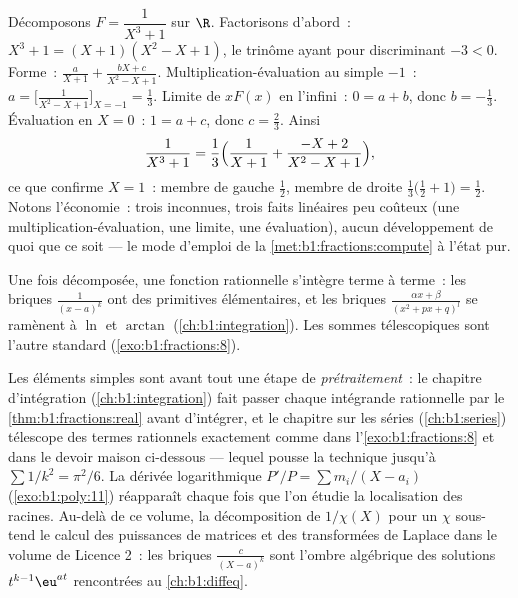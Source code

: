 \begin{example}\label{ex:b1:fractions:cubic}
Décomposons $F = \dfrac{1}{X^3 + 1}$ sur $\R$. Factorisons d'abord~:
$X^3 + 1 = (X + 1)(X^2 - X + 1)$, le trinôme ayant pour discriminant $-3
< 0$. Forme~: $\frac{a}{X+1} + \frac{bX + c}{X^2 - X + 1}$.
Multiplication-évaluation au  simple $-1$~: $a = \bigl[\frac1{X^2 -
X + 1}\bigr]_{X=-1} = \frac13$. Limite de $xF(x)$ en l'infini~: $0 = a +
b$, donc $b = -\frac13$. Évaluation en $X = 0$~: $1 = a + c$, donc $c =
\frac23$. Ainsi
\[
\frac{1}{X^3+1} = \frac13\Bigl(\frac{1}{X+1}
+ \frac{-X + 2}{X^2 - X + 1}\Bigr) ,
\]
ce que confirme $X = 1$~: membre de gauche $\frac12$, membre de droite
$\frac13\bigl(\frac12 + 1\bigr) = \frac12$. Notons l'économie~: trois
inconnues, trois faits linéaires peu coûteux (une
multiplication-évaluation, une limite, une évaluation), aucun
développement de quoi que ce soit --- le mode d'emploi de la
\cref{met:b1:fractions:compute} à l'état pur.
\end{example}

\begin{remark}
Une fois décomposée, une fonction rationnelle s'intègre terme à terme~:
les briques $\frac{1}{(x-a)^k}$ ont des primitives élémentaires, et les
briques $\frac{\alpha x + \beta}{(x^2 + px + q)^l}$ se ramènent à $\ln$
et $\arctan$ (\cref{ch:b1:integration}). Les sommes télescopiques sont
l'autre  standard (\cref{exo:b1:fractions:8}).
\end{remark}

\begin{remark}\label{rem:b1:fractions:whereused}
Les éléments simples sont avant tout une étape de
\emph{prétraitement}~: le chapitre d'intégration
(\cref{ch:b1:integration}) fait passer chaque intégrande rationnelle par
le \cref{thm:b1:fractions:real} avant d'intégrer, et le chapitre sur les
séries (\cref{ch:b1:series}) télescope des termes rationnels exactement
comme dans l'\cref{exo:b1:fractions:8} et dans le devoir maison
ci-dessous --- lequel pousse la technique jusqu'à $\sum 1/k^2 =
\pi^2/6$. La dérivée logarithmique $P'/P = \sum m_i/(X - a_i)$
(\cref{exo:b1:poly:11}) réapparaît chaque fois que l'on étudie la
localisation des racines. Au-delà de ce volume, la décomposition de
$1/\chi(X)$ pour un  $\chi$ sous-tend le calcul
des puissances de matrices et des transformées de Laplace dans le volume
de Licence 2~: les briques $\frac{c}{(X - a)^k}$ sont l'ombre algébrique
des solutions $t^{k-1}\eu^{at}$ rencontrées au \cref{ch:b1:diffeq}.
\end{remark}

